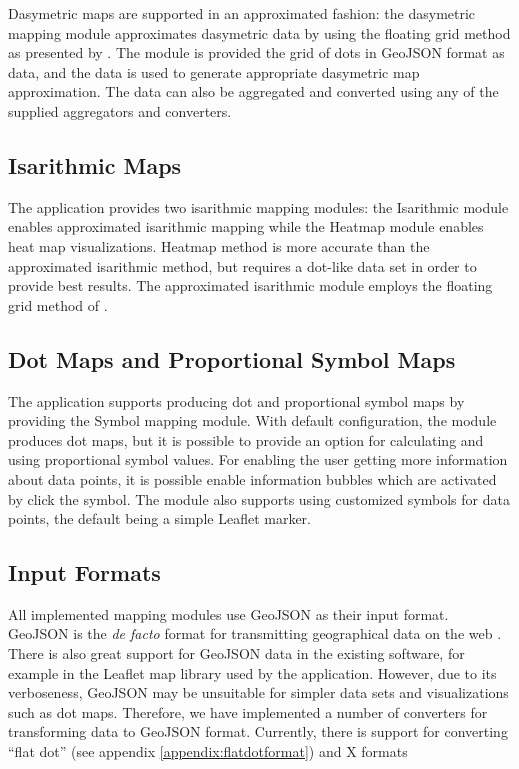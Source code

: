 Dasymetric maps are supported in an approximated fashion: the dasymetric mapping module approximates dasymetric data by using the floating grid method as presented by \citet{langford_generating_1994}. The module is provided the grid of dots in GeoJSON format as data, and the data is used to generate appropriate dasymetric map approximation. The data can also be aggregated and converted using any of the supplied aggregators and converters.


\subsection{Isarithmic Maps}

The application provides two isarithmic mapping modules: the Isarithmic module enables approximated isarithmic mapping while the Heatmap module enables heat map visualizations. Heatmap method is more accurate than the approximated isarithmic method, but requires a dot-like data set in order to provide best results. The approximated isarithmic module employs the floating grid method of \citet{langford_generating_1994}. 


\subsection{Dot Maps and Proportional Symbol Maps}

The application supports producing dot and proportional symbol maps by providing the Symbol mapping module. With default configuration, the module produces dot maps, but it is possible to provide an option for calculating and using proportional symbol values. For enabling the user getting more information about data points, it is possible enable information bubbles which are activated by click the symbol. The module also supports using customized symbols for data points, the default being a simple Leaflet marker.


\subsection{Input Formats}

All implemented mapping modules use GeoJSON as their input format. GeoJSON is the \emph{de facto} format for transmitting geographical data on the web \citep{bostock_code_2013}. There is also great support for GeoJSON data in the existing software, for example in the Leaflet map library used by the application. However, due to its verboseness, GeoJSON may be unsuitable for simpler data sets and visualizations such as dot maps. Therefore, we have implemented a number of converters for transforming data to GeoJSON format. Currently, there is support for converting ``flat dot'' (see appendix \ref{appendix:flatdotformat}) and X formats 

